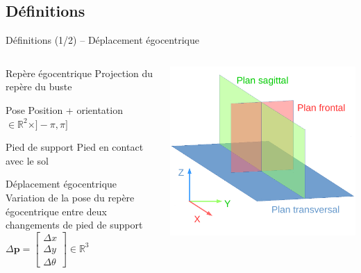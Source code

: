 
\subsection{Définitions}

\begin{frame}{Définitions (1/2) -- Déplacement égocentrique}
    \begin{columns}
        \begin{column}{0.49\textwidth}
            \begin{block}{Repère égocentrique}
                Projection du repère du buste
            \end{block}
            \begin{block}{Pose}
                Position + orientation $\in \mathbb{R}^2 \times ]-\pi,\pi]$
            \end{block}
            \begin{block}{Pied de support}
                Pied en contact avec le sol
            \end{block}
            \begin{block}{Déplacement égocentrique}
                Variation de la pose du repère égocentrique
                entre deux changements de pied de support
                $
                \Delta \bm{p} =
                \begin{bmatrix}
                    \Delta x \\ \Delta y \\ \Delta \theta 
                \end{bmatrix}
                \in \mathbb{R}^3
                $
            \end{block}
        \end{column}
        \begin{column}{0.49\textwidth}
            \centering
            \includegraphics[type=pdf,ext=.pdf,read=.pdf,width=0.6\linewidth]{../schema/planes}

\end{column}
\end{columns}
\end{frame}
